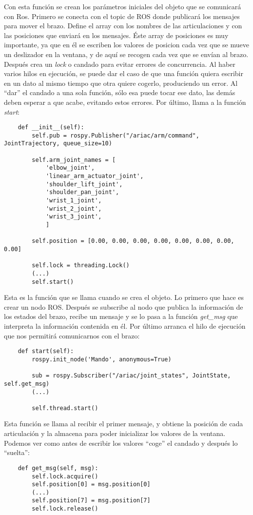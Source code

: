 \begin{itemize}
	Con esta función se crean los parámetros iniciales del objeto que se comunicará con Ros. Primero se conecta con el topic de ROS donde publicará los mensajes para mover el brazo. Define el array con los nombres de las articulaciones y con las posiciones que enviará en los mensajes. Éste array de posiciones es muy importante, ya que en él se escriben los valores de posicion cada vez que se mueve un deslizador en la ventana, y de aquí se recogen cada vez que se envían al brazo. Después crea un \textit{lock} o candado para evitar errores de concurrencia. Al haber varios hilos en ejecución, se puede dar el caso de que una función quiera escribir en un dato al mismo tiempo que otra quiere cogerlo, produciendo un error. Al “dar” el candado a una sola función, sólo esa puede tocar ese dato, las demás deben esperar a que acabe, evitando estos errores. Por último, llama a la función \textit{start}:
	\begin{lstlisting}
	def __init__(self):
		self.pub = rospy.Publisher("/ariac/arm/command", JointTrajectory, queue_size=10)
		
		self.arm_joint_names = [
			'elbow_joint',
			'linear_arm_actuator_joint',
			'shoulder_lift_joint',
			'shoulder_pan_joint',
			'wrist_1_joint',
			'wrist_2_joint',
			'wrist_3_joint',
			]
			
		self.position = [0.00, 0.00, 0.00, 0.00, 0.00, 0.00, 0.00, 0.00]
		
		self.lock = threading.Lock()
		(...)
		self.start()
	\end{lstlisting}
	
	Esta es la función que se llama cuando se crea el objeto. Lo primero que hace es crear un nodo ROS. Después se subscribe al nodo que publica la información de los estados del brazo, recibe un mensaje y se lo pasa a la función \textit{get\_msg} que interpreta la información contenida en él. Por último arranca el hilo de ejecución que nos permitirá comunicarnos con el brazo:
	\begin{lstlisting}
	def start(self):
		rospy.init_node('Mando', anonymous=True)

		sub = rospy.Subscriber("/ariac/joint_states", JointState, self.get_msg)
		(...)
	
		self.thread.start()
	\end{lstlisting}
	
	Esta función se llama al recibir el primer mensaje, y obtiene la posición de cada articulación y la almacena para poder inicializar los valores de la ventana. Podemos ver como antes de escribir los valores “coge” el candado y después lo “suelta”:
	\begin{lstlisting}
	def get_msg(self, msg):
		self.lock.acquire()
		self.position[0] = msg.position[0]
		(...)
		self.position[7] = msg.position[7]
		self.lock.release()
	\end{lstlisting}
	

\end{itemize}
